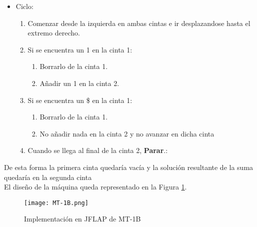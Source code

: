 \begin{itemize}
    \item Ciclo:
    \begin{enumerate}[1.]
        \item Comenzar desde la izquierda en ambas cintas e ir desplazandose hasta el extremo derecho.
        \item Si se encuentra un 1 en la cinta 1:
        \begin{enumerate}[1.]
            \item Borrarlo de la cinta 1.
            \item Añadir un 1 en la cinta 2.
        \end{enumerate}
        \item Si se encuentra un \$ en la cinta 1:
        \begin{enumerate}[1.]
            \item Borrarlo de la cinta 1.
            \item No añadir nada en la cinta 2 y no avanzar en dicha cinta
        \end{enumerate}
        \item Cuando se llega al final de la cinta 2, \textbf{Parar}.:
    \end{enumerate}
\end{itemize}
De esta forma la primera cinta quedaría vacía y la solución resultante de la suma quedaría en la segunda cinta\\

El diseño de la máquina queda representado en la Figura \ref{fig:MT-1B}.

\begin{figure}[h]
    \centering
    \texttt{[image: MT-1B.png]}
    \caption{Implementación en JFLAP de MT-1B}
    \label{fig:MT-1B}
\end{figure}
